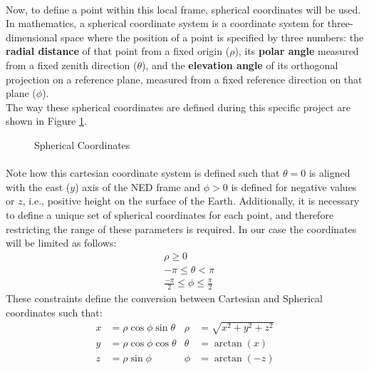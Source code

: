 \paragraph{} Now, to define a point within this local frame, spherical coordinates will be used. In mathematics, a spherical coordinate system is a coordinate system for three-dimensional space where the position of a point is specified by three numbers: the \textbf{radial distance} of that point from a fixed origin ($\rho$), its \textbf{polar angle} measured from a fixed zenith direction ($\theta$), and the \textbf{elevation angle} of its orthogonal projection on a reference plane, measured from a fixed reference direction on that plane ($\phi$).\\
The way these spherical coordinates are defined during this specific project are shown in Figure \ref{fig:Spherical1}.
\begin{figure}[H]
   \centering
     
    \caption{Spherical Coordinates}
    \label{fig:Spherical1}
\end{figure}

\paragraph{} Note how this cartesian coordinate system is defined such that $\theta = 0$ is aligned with the east ($y$) axis of the NED frame and  $\phi > 0$ is defined for negative values or $z$, i.e., positive height on the surface of the Earth.
Additionally, it is necessary to define a unique set of spherical coordinates for each point, and therefore restricting the range of these parameters is required. In our case the coordinates will be limited as follows:
\begin{align*}
& \rho \geq 0 \\
& -\pi \leq \theta < \pi \\
& \frac{-\pi}{2} \leq \phi \leq \frac{\pi}{2}
\label{eq:los_distToHorizon}
\end{align*}
These constraints define the conversion between Cartesian and Spherical coordinates such that:
\begin{align*}
x &=  \rho\cos\phi\sin\theta  & \rho &= \sqrt{x^{2} + y^{2} + z^{2}} \\
y &= \rho\cos\phi\cos\theta   & \theta &= \arctan\left(x\right)\\
z &= \rho\sin\phi       & \phi &=  \arctan\left(-z\right)
\label{eq:los_distToHorizon}
\end{align*} 

